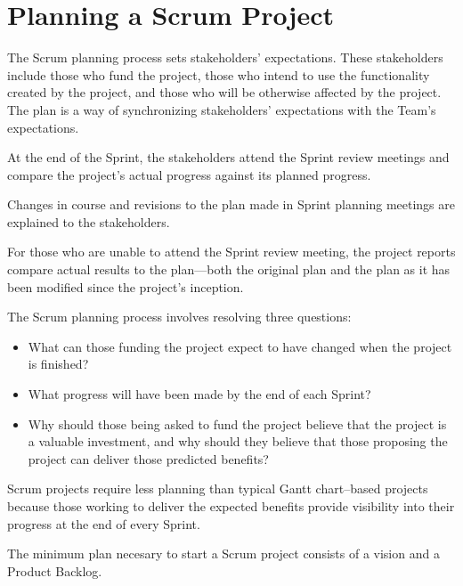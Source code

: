 \pagebreak
\chapter{Planning a Scrum Project}

The Scrum planning process sets stakeholders’ expectations. These stakeholders include those who fund the project, those who intend to use the functionality created by the project, and those who will be otherwise affected by the project. The plan is a way of synchronizing stakeholders’ expectations with the Team’s expectations.

At the end of the Sprint, the stakeholders attend the Sprint review meetings and compare the project’s actual progress against its planned progress.

Changes in course and revisions to the plan made in Sprint planning meetings are explained to the stakeholders.

For those who are unable to attend the Sprint review meeting, the project reports compare actual results to the plan—both the original plan and the plan as it has been modified since the project’s inception.

The Scrum planning process involves resolving three questions:

\begin{itemize}
  \item What can those funding the project expect to have changed when the project is finished?
  \item What progress will have been made by the end of each Sprint?
  \item Why should those being asked to fund the project believe that the project is a valuable investment, and why should they believe that those proposing the project can deliver those predicted benefits?
\end{itemize}


Scrum projects require less planning than typical Gantt chart–based projects because those working to deliver the expected benefits provide visibility into their progress at the end of every Sprint.


The minimum plan necesary to start a Scrum project consists of a vision and a Product Backlog.
